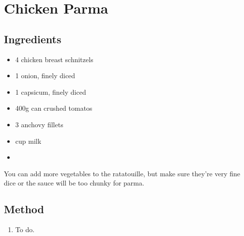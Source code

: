 \clearpage
\section{Chicken Parma}

  
  \subsection{Ingredients}
    
  \begin{itemize}
    \item 4 chicken breast schnitzels
    \item 1 onion, finely diced
    \item 1 capsicum, finely diced
    \item 400g can crushed tomatos
    \item 3 anchovy fillets
    \item {} cup milk
    \item 
  \end{itemize}

  You can add more vegetables to the ratatouille, but make sure they're very fine dice or the sauce will be too chunky for parma.

  \subsection{Method}

  \begin{enumerate}
    \item To do.
  \end{enumerate}
